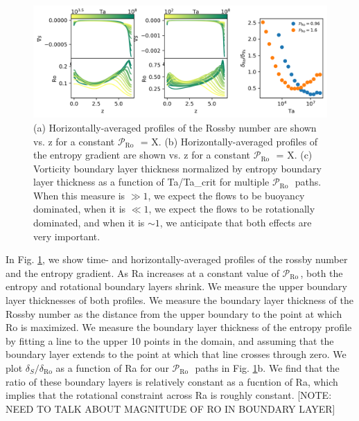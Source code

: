 \documentclass[twocolumn, amsmath, amsfonts, amssymb]{aastex62}
\newcommand{\pro}{\ensuremath{\mathcal{P}_{\text{Ro}}\,}}
\begin{document}
\begin{figure}[h]
\includegraphics[width=\textwidth]{./figs/boundary_layers.png}
\caption{(a) Horizontally-averaged profiles of the Rossby number are shown
vs. z for a constant \pro$\,$ = X. (b) Horizontally-averaged profiles of 
the entropy gradient are shown vs. z for a constant \pro$\,$ = X.
(c) Vorticity boundary layer thickness normalized by entropy boundary layer
thickness as a function of Ta/Ta\_crit for multiple \pro$\,$ paths.
When this measure is $\gg 1$, we expect the flows to be buoyancy dominated,
when it is $\ll 1$, we expect the flows to be rotationally dominated,
and when it is $\sim 1$, we anticipate that both effects are very important.
\label{fig:profiles_and_bls} }
\end{figure}

In Fig. \ref{fig:profiles_and_bls}, we show time- and horizontally-averaged profiles of
the rossby number and the entropy gradient. As Ra increases at a constant value of
\pro, both the entropy and rotational boundary layers shrink. We measure the
upper boundary layer thicknesses of both profiles. We measure the boundary layer thickness
of the Rossby number as the distance from the upper boundary to the point at which Ro
is maximized. We measure the boundary layer thickness of the entropy profile by fitting
a line to the upper 10 points in the domain, and assuming that the boundary layer extends to
the point at which that line crosses through zero. We plot $\delta_S/\delta_{\text{Ro}}$
as a function of Ra for our \pro$\,$ paths in Fig. \ref{fig:profiles_and_bls}b. We find
that the ratio of these boundary layers is relatively constant as a fucntion of Ra, which
implies that the rotational constraint across Ra is roughly constant.
[NOTE: NEED TO TALK ABOUT MAGNITUDE OF RO IN BOUNDARY LAYER]
\end{document}
